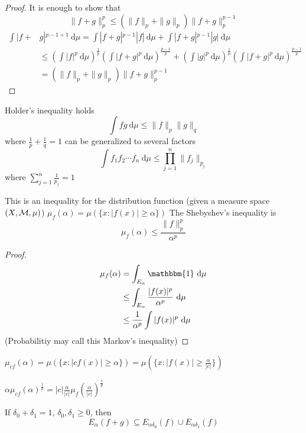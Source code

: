 \begin{proof}
  It is enough to show that
  \[\|f+g\|_p^p \le (\|f\|_p + \|g\|_p)\|f+g\|_p^{p-1}\]
  \begin{align*}
    \int |f+&g|^{p-1+1} \ \mathrm{d}\mu = \int |f + g|^{p-1}|f|\ \mathrm{d}\mu + \int |f+g|^{p-1}|g|\ \mathrm{d}\mu \\
    &\le \left(\int |f|^{p}\ \mathrm{d}\mu\right)^{\frac{1}{p}}\left(\int |f+g|^p\ \mathrm{d}\mu\right)^{\frac{p-1}p} + \left(\int |g|^{p}\ \mathrm{d}\mu\right)^{\frac{1}{p}}\left(\int |f+g|^p\ \mathrm{d}\mu\right)^{\frac{p-1}p} \\
    &= (\|f\|_p + \|g\|_p)\|f+g\|_p^{p-1}
  \end{align*}
\end{proof}

\begin{remark}
  Holder's inequality holds
  \[\int fg\ \mathrm{d}\mu \le \|f\|_{p}\|g\|_{q}\]
  where $\frac1p + \frac1{q} = 1$ can be generalized to several factors
  \[\int f_1f_2\dotsm f_n\ \mathrm{d}\mu \le \prod_{j=1}^n \|f_j\|_{p_j}\]
  where $\sum_{j=1}^n \frac1{p_j} = 1$
\end{remark}

\begin{lemma}
  This is an inequality for the distribution function (given a measure space $(X, \mathcal M, \mu)$) 
  $\mu_f(\alpha) = \mu(\{x : |f(x)| \ge \alpha\})$
  The Shebyshev's inequality is 
  \[\mu_f(\alpha) \le \frac{\|f\|_p^p}{\alpha^p}\]
\end{lemma}
\begin{proof}
  \begin{align*}
    \mu_f(\alpha) &= \int_{E_\alpha} \mathbbm{1} \ \mathrm{d}\mu \\
    &\le \int_{E_\alpha} \frac{|f(x)|^p}{\alpha^p}\ \mathrm{d}\mu \\
    &\le \frac1{\alpha^p}\int |f(x)|^p \ \mathrm{d}\mu \\
  \end{align*} 
  (Probabilitiy may call this Markov's inequality)
\end{proof}

$\mu_{cf}(\alpha) = \mu(\{x : |cf(x)| \ge \alpha\}) = \mu(\{x : |f(x)| \ge \frac{\alpha}{|c|}\})$

$\alpha\mu_{cf}(\alpha)^{\frac1p} = |c|\frac\alpha{|c|}\mu_f\left(\frac\alpha{|c|}\right)^{\frac1p} 
$


\begin{claim}
  If $\delta_0 + \delta_1 = 1$, $\delta_0, \delta_1 \ge 0$, then
  \[E_\alpha(f + g) \subseteq E_{\alpha\delta_0}(f) \cup E_{\alpha\delta_1}(f)\]
\end{claim}

